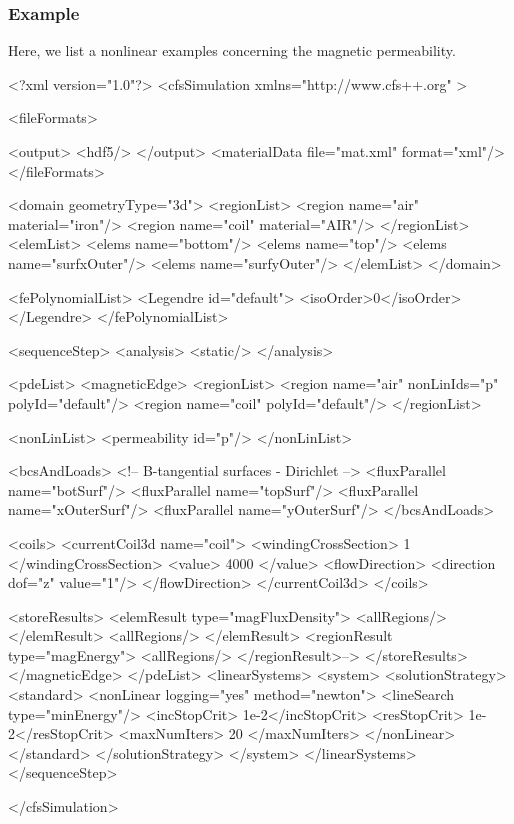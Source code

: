 \subsubsection{Example}
Here, we list a nonlinear examples concerning the magnetic
permeability.
{\footnotesize
\begin{xmllisting}
<?xml version="1.0"?>
<cfsSimulation xmlns="http://www.cfs++.org" >

  <fileFormats>
    
    <output>
    <hdf5/>
    </output>
    <materialData file="mat.xml" format="xml"/>
  </fileFormats>

  <domain geometryType="3d">
    <regionList>
      <region name="air" material="iron"/>
      <region name="coil" material="AIR"/>
    </regionList>
    <elemList>
      <elems name="bottom"/>
      <elems name="top"/>
      <elems name="surfxOuter"/>
      <elems name="surfyOuter"/>
    </elemList>
  </domain>
  
  <fePolynomialList>
    <Legendre id="default">
      <isoOrder>0</isoOrder>
    </Legendre>
  </fePolynomialList>
    
   <sequenceStep>
    <analysis>
      <static/>
    </analysis>
    
     <pdeList>
       <magneticEdge>
         <regionList>
           <region name="air" nonLinIds="p" polyId="default"/>
           <region name="coil" polyId="default"/>
         </regionList>
         
         <nonLinList>
           <permeability id="p"/>
         </nonLinList>
         
         <bcsAndLoads>
           <!-- B-tangential surfaces -  Dirichlet -->
           <fluxParallel name="botSurf"/>
           <fluxParallel name="topSurf"/>
           <fluxParallel name="xOuterSurf"/>
           <fluxParallel name="yOuterSurf"/>
         </bcsAndLoads>
         
         <coils>
           <currentCoil3d name="coil">
             <windingCrossSection>  1 </windingCrossSection>
             <value> 4000 </value>
             <flowDirection>
               <direction dof="z" value="1"/>
             </flowDirection>
           </currentCoil3d>
         </coils>
         
         <storeResults>          
           <elemResult type="magFluxDensity">
             <allRegions/>
           </elemResult>
             <allRegions/>
             </elemResult>
             <regionResult type="magEnergy"> 
            <allRegions/>
          </regionResult>-->
        </storeResults>
      </magneticEdge>
    </pdeList>
     <linearSystems>
       <system>
         <solutionStrategy>
           <standard>
             <nonLinear logging="yes" method="newton">
               <lineSearch type="minEnergy"/>
               <incStopCrit> 1e-2</incStopCrit>
               <resStopCrit> 1e-2</resStopCrit>
               <maxNumIters> 20  </maxNumIters>
             </nonLinear>
           </standard>
         </solutionStrategy>
       </system>
     </linearSystems>
   </sequenceStep>
    
</cfsSimulation>
\end{xmllisting}
}

